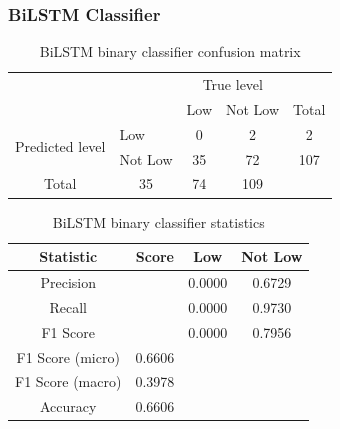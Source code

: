 \documentclass[12pt, a4paper]{article}
\begin{document}

\subsubsection{BiLSTM Classifier}

\begin{table}[ht]
\centering
\begin{tabular}{l|l|c|c|c}
\multicolumn{2}{c}{}&\multicolumn{2}{c}{True level}&\\
\cline{3-4}
\multicolumn{2}{c|}{}&Low&Not Low&\multicolumn{1}{c}{Total}\\
\cline{2-4}
\multirow{2}{*}{Predicted level}& Low & 0 & 2 & 2\\
\cline{2-4}
& Not Low & 35 & 72 & 107\\
\cline{2-4}
\multicolumn{1}{c}{Total} & \multicolumn{1}{c}{35} & \multicolumn{    1}{c}{74} & \multicolumn{1}{c}{109}\\
\end{tabular}
\caption{BiLSTM binary classifier confusion matrix}
\label{table:bilstm_low}
\end{table}

\begin{table}[ht]
\centering
\begin{tabular}{||c c c c||} 
 \hline
 Statistic & Score & Low & Not Low  \\ [0.5ex] 
 \hline\hline
 Precision &  & 0.0000 & 0.6729 \\ 
 Recall & & 0.0000 & 0.9730 \\
 F1 Score &  & 0.0000 & 0.7956 \\
 F1 Score (micro) & 0.6606 & & \\
 F1 Score (macro)  & 0.3978 & &  \\ 
 Accuracy  & 0.6606 & & \\ [1ex] 
 \hline
\end{tabular}
\caption{BiLSTM binary classifier statistics}
\label{table:bilstmstat_low}
\end{table}
\end{document}
